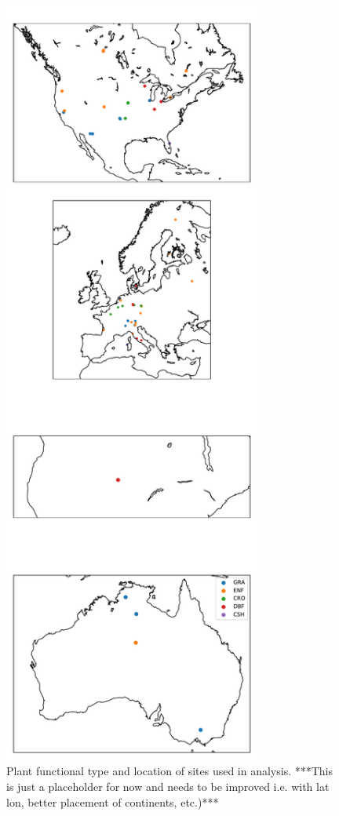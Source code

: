 \documentclass[draft,linenumbers]{agujournal}
\begin{document}
\begin{figure}[h]
\centering
\includegraphics[width=20pc]{./fig01.pdf}
\caption{Plant functional type and location of sites used in analysis. ***This is just a placeholder for now and needs to be improved i.e. with lat lon, better placement of continents, etc.)***}
\label{map_fig}
 \end{figure}
\end{document}
